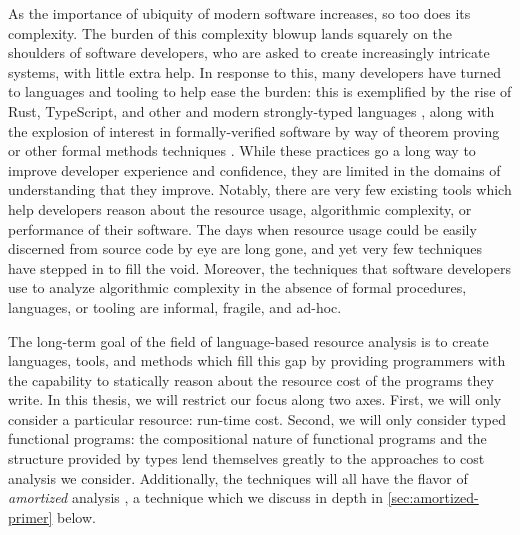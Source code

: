 

As the importance of ubiquity of modern software increases, so too does its complexity. The burden of this complexity blowup lands squarely on the shoulders of software developers, who are asked to create increasingly intricate systems, with little extra help. In response to this, many developers have turned to languages and tooling to help ease the burden: this is exemplified by the rise of Rust, TypeScript, and other and modern strongly-typed languages \cite{rust} \cite{d-lang} \cite{typescript},  along with the explosion of interest in formally-verified software by way of theorem proving or other formal methods techniques \cite{ringer-et-al:qed}. While these practices go a long way to improve developer experience and confidence, they are limited in the domains of understanding that they improve. Notably, there are very few existing tools which help developers reason about the resource usage, algorithmic complexity, or performance of their software. The days when resource usage could be easily discerned from source code by eye are long gone, and yet very few techniques have stepped in to fill the void. Moreover, the techniques that software developers use to analyze algorithmic complexity in the absence of formal procedures, languages, or tooling are informal, fragile, and ad-hoc.

The long-term goal of the field of language-based resource analysis is to create languages, tools, and methods which fill this gap by providing programmers with the capability to statically reason about the resource cost of the programs they write. In this thesis, we will restrict our focus along two axes. First, we will only consider a particular resource: run-time cost.
Second, we will only consider typed functional programs: the compositional nature of functional programs and the structure provided by types lend themselves greatly to the approaches to cost analysis we consider. Additionally, the techniques will all have the flavor of \textit{amortized} analysis \cite{tarjan:amortized-complexity}, a technique which we discuss in depth in \autoref{sec:amortized-primer} below.



